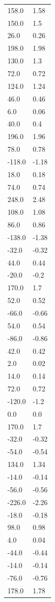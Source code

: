 \begin{longtable}{ll}
158.0 & 1.58 \\
150.0 & 1.5 \\
26.0 & 0.26 \\
198.0 & 1.98 \\
130.0 & 1.3 \\
72.0 & 0.72 \\
124.0 & 1.24 \\
46.0 & 0.46 \\
6.0 & 0.06 \\
40.0 & 0.4 \\
196.0 & 1.96 \\
78.0 & 0.78 \\
-118.0 & -1.18 \\
18.0 & 0.18 \\
74.0 & 0.74 \\
248.0 & 2.48 \\
108.0 & 1.08 \\
86.0 & 0.86 \\
-138.0 & -1.38 \\
-32.0 & -0.32 \\
44.0 & 0.44 \\
-20.0 & -0.2 \\
170.0 & 1.7 \\
52.0 & 0.52 \\
-66.0 & -0.66 \\
54.0 & 0.54 \\
-86.0 & -0.86 \\
42.0 & 0.42 \\
2.0 & 0.02 \\
14.0 & 0.14 \\
72.0 & 0.72 \\
-120.0 & -1.2 \\
0.0 & 0.0 \\
170.0 & 1.7 \\
-32.0 & -0.32 \\
-54.0 & -0.54 \\
134.0 & 1.34 \\
-14.0 & -0.14 \\
-56.0 & -0.56 \\
-226.0 & -2.26 \\
-18.0 & -0.18 \\
98.0 & 0.98 \\
4.0 & 0.04 \\
-44.0 & -0.44 \\
-14.0 & -0.14 \\
-76.0 & -0.76 \\
178.0 & 1.78 \\

\end{longtable}
